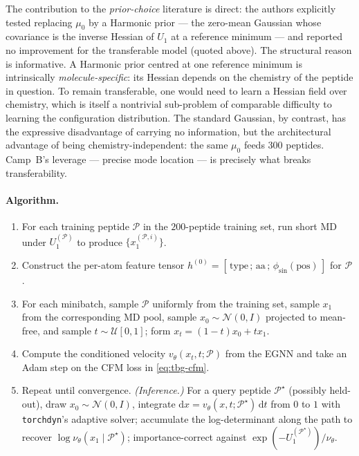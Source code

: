 \documentclass[11pt,letterpaper]{article}
\newcommand{\dd}{\mathrm{d}}
\theoremstyle{plain}
\begin{document}
The contribution to the \emph{prior-choice} literature is direct: the
authors explicitly tested replacing $\mu_0$ by a Harmonic prior --- the
zero-mean Gaussian whose covariance is the inverse Hessian of $U_1$ at a
reference minimum --- and reported no improvement for the transferable
model (quoted above). The structural reason is informative. A Harmonic prior centred at one
reference minimum is intrinsically \emph{molecule-specific}: its Hessian
depends on the chemistry of the peptide in question. To remain transferable,
one would need to learn a Hessian field over chemistry, which is itself a
nontrivial sub-problem of comparable difficulty to learning the
configuration distribution. The standard Gaussian, by contrast, has the
expressive disadvantage of carrying no information, but the architectural
advantage of being chemistry-independent: the same $\mu_0$ feeds 300
peptides. Camp~B's leverage --- precise mode location --- is precisely what
breaks transferability.

\paragraph{Algorithm.}
\begin{enumerate}\setlength{\itemsep}{1pt}
  \item For each training peptide $\mathcal P$ in the $200$-peptide training
    set, run short MD under $U_1^{(\mathcal P)}$ to produce
    $\{x_1^{(\mathcal P,i)}\}$.
  \item Construct the per-atom feature tensor
    $h^{(0)}=[\,\mathrm{type}\,;\,\mathrm{aa}\,;\,\phi_{\sin}(\mathrm{pos})\,]$
    for $\mathcal P$.
  \item For each minibatch, sample $\mathcal P$ uniformly from the training
    set, sample $x_1$ from the corresponding MD pool, sample
    $x_0\sim\mathcal N(0,I)$ projected to mean-free, and sample
    $t\sim\mathcal U[0,1]$; form $x_t = (1-t)x_0+t x_1$.
  \item Compute the conditioned velocity $v_\theta(x_t,t;\mathcal P)$ from
    the EGNN and take an Adam step on the CFM loss in \eqref{eq:tbg-cfm}.
  \item Repeat until convergence. \emph{(Inference.)} For a query peptide
    $\mathcal P^\star$ (possibly held-out), draw $x_0\sim\mathcal N(0,I)$,
    integrate $\dd x = v_\theta(x,t;\mathcal P^\star)\,\dd t$ from $0$ to $1$
    with \texttt{torchdyn}'s adaptive solver; accumulate the log-determinant
    along the path to recover $\log\nu_\theta(x_1\mid\mathcal P^\star)$;
    importance-correct against $\exp(-U_1^{(\mathcal P^\star)})/\nu_\theta$.
\end{enumerate}
\end{document}
